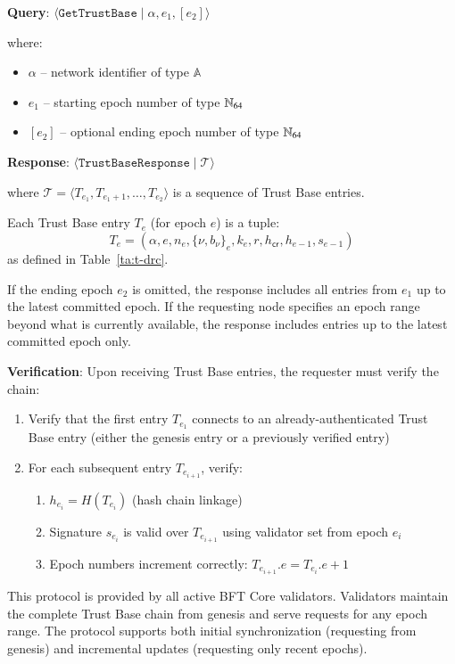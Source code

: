 \textbf{Query}: $\langle \texttt{GetTrustBase} \mid \alpha, e_1, [e_2] \rangle$

where:
\begin{itemize}
	\item $\alpha$ -- network identifier of type $\mathbb{A}$
	\item $e_1$ -- starting epoch number of type $\mathbb{N}_{64}$
	\item $[e_2]$ -- optional ending epoch number of type $\mathbb{N}_{64}$
\end{itemize}

\textbf{Response}: $\langle \texttt{TrustBaseResponse} \mid \mathcal{T} \rangle$

where $\mathcal{T} = \langle T_{e_1}, T_{e_1+1}, \ldots, T_{e_2} \rangle$ is a sequence of Trust Base entries.

Each Trust Base entry $T_e$ (for epoch $e$) is a tuple:
\[
T_e = (\alpha, e, n_e, \{\nu, b_\nu\}_e, k_e, r, h_{\mathsf{cr}}, h_{e-1}, s_{e-1})
\]
as defined in Table~\ref{ta:t-drc}.

If the ending epoch $e_2$ is omitted, the response includes all entries from $e_1$ up to the latest committed epoch. If the requesting node specifies an epoch range beyond what is currently available, the response includes entries up to the latest committed epoch only.

\textbf{Verification}: Upon receiving Trust Base entries, the requester must verify the chain:
\begin{enumerate}
	\item Verify that the first entry $T_{e_1}$ connects to an already-authenticated Trust Base entry (either the genesis entry or a previously verified entry)
	\item For each subsequent entry $T_{e_{i+1}}$, verify:
	\begin{enumerate}
		\item $h_{e_i} = H(T_{e_i})$ (hash chain linkage)
		\item Signature $s_{e_i}$ is valid over $T_{e_{i+1}}$ using validator set from epoch $e_i$
		\item Epoch numbers increment correctly: $T_{e_{i+1}}.e = T_{e_i}.e + 1$
	\end{enumerate}
\end{enumerate}

This protocol is provided by all active BFT Core validators. Validators maintain the complete Trust Base chain from genesis and serve requests for any epoch range. The protocol supports both initial synchronization (requesting from genesis) and incremental updates (requesting only recent epochs).


